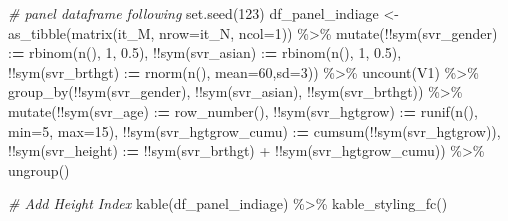 \documentclass[
]{book}
\newenvironment{Shaded}{\begin{snugshade}}{\end{snugshade}}
\newcommand{\AttributeTok}[1]{\textcolor[rgb]{0.77,0.63,0.00}{#1}}
\newcommand{\CommentTok}[1]{\textcolor[rgb]{0.56,0.35,0.01}{\textit{#1}}}
\newcommand{\DecValTok}[1]{\textcolor[rgb]{0.00,0.00,0.81}{#1}}
\newcommand{\ErrorTok}[1]{\textcolor[rgb]{0.64,0.00,0.00}{\textbf{#1}}}
\newcommand{\FloatTok}[1]{\textcolor[rgb]{0.00,0.00,0.81}{#1}}
\newcommand{\FunctionTok}[1]{\textcolor[rgb]{0.00,0.00,0.00}{#1}}
\newcommand{\NormalTok}[1]{#1}
\newcommand{\OtherTok}[1]{\textcolor[rgb]{0.56,0.35,0.01}{#1}}
\newcommand{\SpecialCharTok}[1]{\textcolor[rgb]{0.00,0.00,0.00}{#1}}
\begin{document}
\begin{Shaded}
\begin{Highlighting}[]
\CommentTok{\# panel dataframe following}
\FunctionTok{set.seed}\NormalTok{(}\DecValTok{123}\NormalTok{)}
\NormalTok{df\_panel\_indiage }\OtherTok{\textless{}{-}} \FunctionTok{as\_tibble}\NormalTok{(}\FunctionTok{matrix}\NormalTok{(it\_M, }\AttributeTok{nrow=}\NormalTok{it\_N, }\AttributeTok{ncol=}\DecValTok{1}\NormalTok{)) }\SpecialCharTok{\%\textgreater{}\%}
  \FunctionTok{mutate}\NormalTok{(}\SpecialCharTok{!!}\FunctionTok{sym}\NormalTok{(svr\_gender) }\SpecialCharTok{:}\ErrorTok{=} \FunctionTok{rbinom}\NormalTok{(}\FunctionTok{n}\NormalTok{(), }\DecValTok{1}\NormalTok{, }\FloatTok{0.5}\NormalTok{),}
         \SpecialCharTok{!!}\FunctionTok{sym}\NormalTok{(svr\_asian) }\SpecialCharTok{:}\ErrorTok{=} \FunctionTok{rbinom}\NormalTok{(}\FunctionTok{n}\NormalTok{(), }\DecValTok{1}\NormalTok{, }\FloatTok{0.5}\NormalTok{),}
         \SpecialCharTok{!!}\FunctionTok{sym}\NormalTok{(svr\_brthgt) }\SpecialCharTok{:}\ErrorTok{=} \FunctionTok{rnorm}\NormalTok{(}\FunctionTok{n}\NormalTok{(), }\AttributeTok{mean=}\DecValTok{60}\NormalTok{,}\AttributeTok{sd=}\DecValTok{3}\NormalTok{)) }\SpecialCharTok{\%\textgreater{}\%}
  \FunctionTok{uncount}\NormalTok{(V1) }\SpecialCharTok{\%\textgreater{}\%}
  \FunctionTok{group\_by}\NormalTok{(}\SpecialCharTok{!!}\FunctionTok{sym}\NormalTok{(svr\_gender), }\SpecialCharTok{!!}\FunctionTok{sym}\NormalTok{(svr\_asian), }\SpecialCharTok{!!}\FunctionTok{sym}\NormalTok{(svr\_brthgt)) }\SpecialCharTok{\%\textgreater{}\%}
  \FunctionTok{mutate}\NormalTok{(}\SpecialCharTok{!!}\FunctionTok{sym}\NormalTok{(svr\_age) }\SpecialCharTok{:}\ErrorTok{=} \FunctionTok{row\_number}\NormalTok{(),}
         \SpecialCharTok{!!}\FunctionTok{sym}\NormalTok{(svr\_hgtgrow) }\SpecialCharTok{:}\ErrorTok{=} \FunctionTok{runif}\NormalTok{(}\FunctionTok{n}\NormalTok{(), }\AttributeTok{min=}\DecValTok{5}\NormalTok{, }\AttributeTok{max=}\DecValTok{15}\NormalTok{),}
         \SpecialCharTok{!!}\FunctionTok{sym}\NormalTok{(svr\_hgtgrow\_cumu) }\SpecialCharTok{:}\ErrorTok{=} \FunctionTok{cumsum}\NormalTok{(}\SpecialCharTok{!!}\FunctionTok{sym}\NormalTok{(svr\_hgtgrow)),}
         \SpecialCharTok{!!}\FunctionTok{sym}\NormalTok{(svr\_height) }\SpecialCharTok{:}\ErrorTok{=} \SpecialCharTok{!!}\FunctionTok{sym}\NormalTok{(svr\_brthgt) }\SpecialCharTok{+} \SpecialCharTok{!!}\FunctionTok{sym}\NormalTok{(svr\_hgtgrow\_cumu))  }\SpecialCharTok{\%\textgreater{}\%}
  \FunctionTok{ungroup}\NormalTok{()}

\CommentTok{\# Add Height Index}
\FunctionTok{kable}\NormalTok{(df\_panel\_indiage) }\SpecialCharTok{\%\textgreater{}\%} \FunctionTok{kable\_styling\_fc}\NormalTok{()}
\end{Highlighting}
\end{Shaded}
\end{document}
